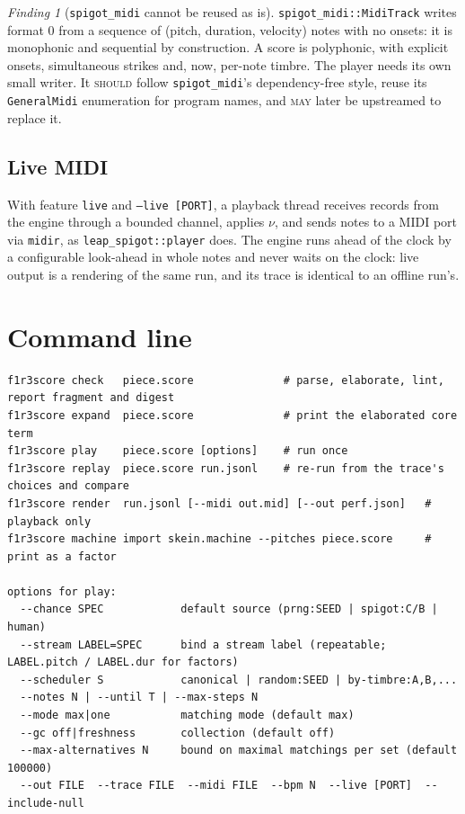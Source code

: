 \documentclass[11pt,a4paper]{article}
\theoremstyle{definition}
\theoremstyle{remark}
\newtheorem{finding}[requirement]{Finding}
\newcommand{\SHOULD}{\textsc{should}}
\newcommand{\MAY}{\textsc{may}}
\begin{document}
\begin{finding}[\texttt{spigot\_midi} cannot be reused as is]
\texttt{spigot\_midi::MidiTrack} writes format 0 from a sequence of
(pitch, duration, velocity) notes with no onsets: it is monophonic and
sequential by construction. A score is polyphonic, with explicit onsets,
simultaneous strikes and, now, per-note timbre. The player needs its own small
writer. It \SHOULD{} follow \texttt{spigot\_midi}'s dependency-free style, reuse
its \texttt{GeneralMidi} enumeration for program names, and \MAY{} later be
upstreamed to replace it.
\end{finding}

\subsection{Live MIDI}

With feature \texttt{live} and \texttt{--live [PORT]}, a playback thread
receives records from the engine through a bounded channel, applies $\nu$, and
sends notes to a MIDI port via \texttt{midir}, as \texttt{leap\_spigot::player}
does. The engine runs ahead of the clock by a configurable look-ahead in whole
notes and never waits on the clock: live output is a rendering of the same run,
and its trace is identical to an offline run's.

\section{Command line}\label{sec:cli}

\begin{lstlisting}
f1r3score check   piece.score              # parse, elaborate, lint, report fragment and digest
f1r3score expand  piece.score              # print the elaborated core term
f1r3score play    piece.score [options]    # run once
f1r3score replay  piece.score run.jsonl    # re-run from the trace's choices and compare
f1r3score render  run.jsonl [--midi out.mid] [--out perf.json]   # playback only
f1r3score machine import skein.machine --pitches piece.score     # print as a factor

options for play:
  --chance SPEC            default source (prng:SEED | spigot:C/B | human)
  --stream LABEL=SPEC      bind a stream label (repeatable; LABEL.pitch / LABEL.dur for factors)
  --scheduler S            canonical | random:SEED | by-timbre:A,B,...
  --notes N | --until T | --max-steps N
  --mode max|one           matching mode (default max)
  --gc off|freshness       collection (default off)
  --max-alternatives N     bound on maximal matchings per set (default 100000)
  --out FILE  --trace FILE  --midi FILE  --bpm N  --live [PORT]  --include-null
\end{lstlisting}
\end{document}
